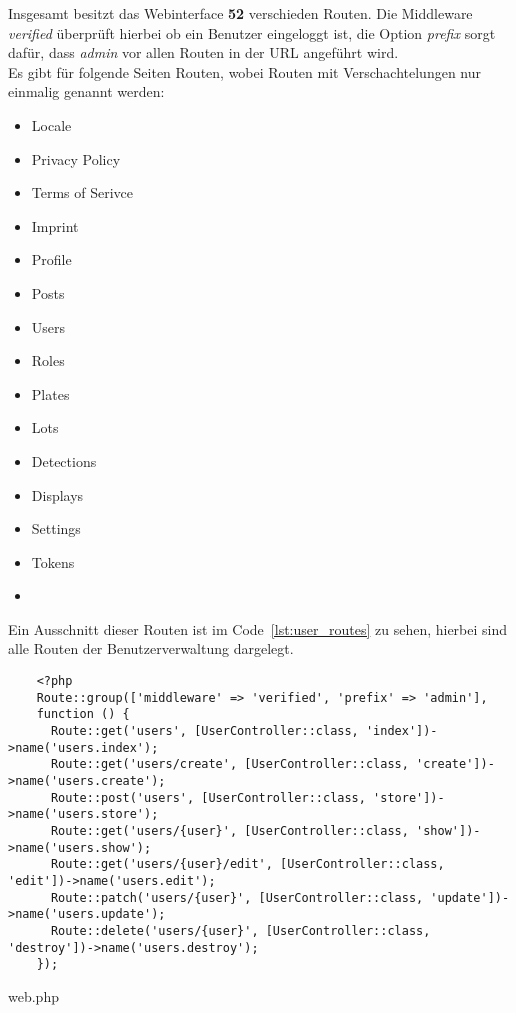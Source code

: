 Insgesamt besitzt das Webinterface \textbf{52} verschieden Routen. Die Middleware \textit{verified}
überprüft hierbei ob ein Benutzer eingeloggt ist, die Option \textit{prefix}
sorgt dafür, dass \textit{admin} vor allen Routen in der URL angeführt wird.\\

Es gibt für folgende Seiten Routen, wobei Routen mit Verschachtelungen nur einmalig genannt
werden:

\begin{multicols}{2}
  \begin{itemize}
    \item Locale  \item Privacy Policy \item Terms of Serivce \item Imprint
    \item Profile \item Posts \item Users \item Roles
    \item Plates \item Lots \item Detections \item Displays
    \item Settings \item Tokens  \item[\vspace{\fill}]
  \end{itemize}
\end{multicols}

Ein Ausschnitt dieser Routen ist im Code~\ref{lst:user_routes} zu sehen, hierbei
sind alle Routen der Benutzerverwaltung dargelegt.

\begin{listing}[H]
  \begin{verbatim}
    <?php
    Route::group(['middleware' => 'verified', 'prefix' => 'admin'], 
    function () {
      Route::get('users', [UserController::class, 'index'])->name('users.index');
      Route::get('users/create', [UserController::class, 'create'])->name('users.create');
      Route::post('users', [UserController::class, 'store'])->name('users.store');
      Route::get('users/{user}', [UserController::class, 'show'])->name('users.show');
      Route::get('users/{user}/edit', [UserController::class, 'edit'])->name('users.edit');
      Route::patch('users/{user}', [UserController::class, 'update'])->name('users.update');
      Route::delete('users/{user}', [UserController::class, 'destroy'])->name('users.destroy');
    });
  \end{verbatim}
  \caption{web.php}
  \label{lst:user_routes}
\end{listing}

